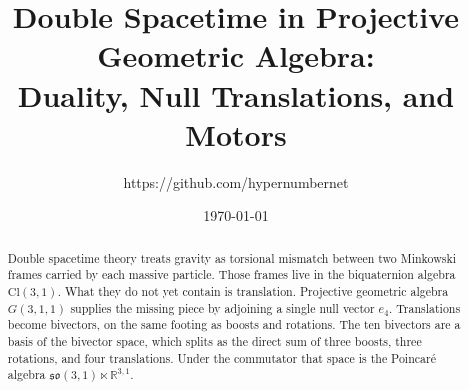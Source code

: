 \documentclass[a4paper]{article}
\title{Double Spacetime in Projective Geometric Algebra:\\
Duality, Null Translations, and Motors}
\author{https://github.com/hypernumbernet}
\date{\today}
\begin{document}
\maketitle

\begin{abstract}
Double spacetime theory treats gravity as torsional mismatch between two Minkowski frames carried by each massive particle. Those frames live in the biquaternion algebra \(\mathrm{Cl}(3,1)\). What they do not yet contain is translation. Projective geometric algebra \(G(3,1,1)\) supplies the missing piece by adjoining a single null vector \(e_{4}\). Translations become bivectors, on the same footing as boosts and rotations. The ten bivectors are a basis of the bivector space, which splits as the direct sum of three boosts, three rotations, and four translations. Under the commutator that space is the Poincar\'{e} algebra \(\mathfrak{so}(3,1)\ltimes\mathbb{R}^{3,1}\).


\end{abstract}
\end{document}

